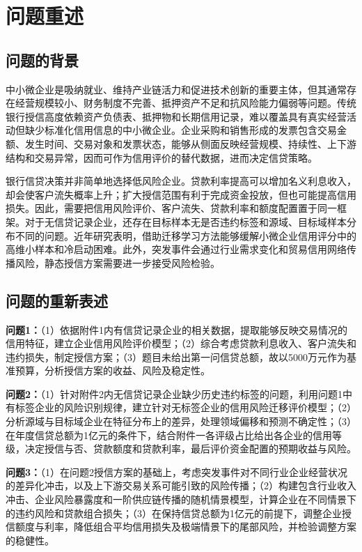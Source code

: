 \documentclass[UTF8,a4paper,12pt,fontset=fandol]{ctexart}
\numberwithin{equation}{section}
\begin{document}
\section{问题重述}

\subsection{问题的背景}

中小微企业是吸纳就业、维持产业链活力和促进技术创新的重要主体，但其通常存在经营规模较小、财务制度不完善、抵押资产不足和抗风险能力偏弱等问题。传统银行授信高度依赖资产负债表、抵押物和长期信用记录，难以覆盖具有真实经营活动但缺少标准化信用信息的中小微企业。企业采购和销售形成的发票包含交易金额、发生时间、交易对象和发票状态，能够从侧面反映经营规模、持续性、上下游结构和交易异常，因而可作为信用评价的替代数据，进而决定信贷策略。

银行信贷决策并非简单地选择低风险企业。贷款利率提高可以增加名义利息收入，却会使客户流失概率上升；扩大授信范围有利于完成资金投放，但也可能提高信用损失。因此，需要把信用风险评价、客户流失、贷款利率和额度配置置于同一框架。对于无信贷记录企业，还存在目标样本无是否违约标签和源域、目标域样本分布不同的问题。近年研究表明，借助迁移学习方法能够缓解小微企业信用评分中的高维小样本和冷启动困难\cite{fang2023,suryanto2022}。此外，突发事件会通过行业需求变化和贸易信用网络传播风险\cite{berloco2021}，静态授信方案需要进一步接受风险检验。

\subsection{问题的重新表述}

\textbf{问题1：}（1）依据附件1内有信贷记录企业的相关数据，提取能够反映交易情况的信用特征，建立企业信用风险评价模型；（2）综合考虑贷款利息收入、客户流失和违约损失，制定授信方案；（3）题目未给出第一问信贷总额，故以5000万元作为基准预算，分析授信方案的收益、风险及稳定性。\par


\textbf{问题2：}（1）针对附件2内无信贷记录企业缺少历史违约标签的问题，利用问题1中有标签企业的风险识别规律，建立针对无标签企业的信用风险迁移评价模型；（2）分析源域与目标域企业在特征分布上的差异，处理领域偏移和预测不确定性；（3）在年度信贷总额为1亿元的条件下，结合附件一各评级占比给出各企业的信用等级，决定授信与否、贷款额度和贷款利率，最后评价资金配置的预期收益与风险。


\textbf{问题3：}（1）在问题2授信方案的基础上，考虑突发事件对不同行业企业经营状况的差异化冲击，以及上下游交易关系可能引致的风险传播；（2）构建包含行业收入冲击、企业风险暴露度和一阶供应链传播的随机情景模型，计算企业在不同情景下的违约风险和贷款组合损失；（3）在保持信贷总额为1亿元的前提下，调整企业授信额度与利率，降低组合平均信用损失及极端情景下的尾部风险，并检验调整方案的稳健性。
\end{document}
